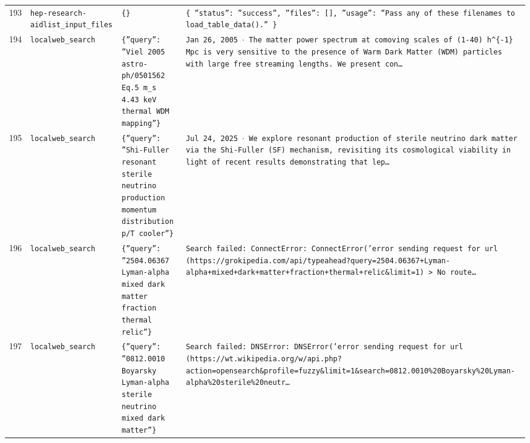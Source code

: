 \documentclass[11pt,a4paper]{article}
\begin{document}
\begin{longtable}{@{}p{}p{}p{}p{}@{}}
193 & \texttt{hep-research-aid}\newline\texttt{list\_\allowbreak{}input\_\allowbreak{}files} & \texttt{\{\}\allowbreak{}} & \texttt{\{   ''status'':\allowbreak{} ''success'',\allowbreak{}   ''files'':\allowbreak{} []\allowbreak{},\allowbreak{}   ''usage'':\allowbreak{} ''Pass any of these filenames to load\_\allowbreak{}table\_\allowbreak{}data()\allowbreak{}.'' \}\allowbreak{}} \\
194 & \texttt{local}\newline\texttt{web\_\allowbreak{}search} & \texttt{\{''query'':\allowbreak{} ''Viel 2005 astro-ph/\allowbreak{}0501562 Eq.5 m\_\allowbreak{}s 4.43 keV thermal WDM mapping''\}\allowbreak{}} & \texttt{Jan 26,\allowbreak{} 2005 $\cdot$ The matter power spectrum at comoving scales of (1-40)\allowbreak{} h\textasciicircum{}\allowbreak{}\{-1\}\allowbreak{} Mpc is very sensitive to the presence of Warm Dark Matter (WDM)\allowbreak{} particles with large free streaming lengths. We present con\ldots{}\allowbreak{}} \\
195 & \texttt{local}\newline\texttt{web\_\allowbreak{}search} & \texttt{\{''query'':\allowbreak{} ''Shi-Fuller resonant sterile neutrino production momentum distribution p/\allowbreak{}T cooler''\}\allowbreak{}} & \texttt{Jul 24,\allowbreak{} 2025 $\cdot$ We explore resonant production of sterile neutrino dark matter via the Shi-Fuller (SF)\allowbreak{} mechanism,\allowbreak{} revisiting its cosmological viability in light of recent results demonstrating that lep\ldots{}\allowbreak{}} \\
196 & \texttt{local}\newline\texttt{web\_\allowbreak{}search} & \texttt{\{''query'':\allowbreak{} ''2504.06367 Lyman-alpha mixed dark matter fraction thermal relic''\}\allowbreak{}} & \texttt{Search failed:\allowbreak{} ConnectError:\allowbreak{} ConnectError('error sending request for url (https:\allowbreak{}/\allowbreak{}/\allowbreak{}grokipedia.com/\allowbreak{}api/\allowbreak{}typeahead?query=\allowbreak{}2504.06367+Lyman-alpha+mixed+dark+matter+fraction+thermal+relic\&limit=\allowbreak{}1)\allowbreak{} \textgreater{}\allowbreak{} No route\ldots{}\allowbreak{}} \\
197 & \texttt{local}\newline\texttt{web\_\allowbreak{}search} & \texttt{\{''query'':\allowbreak{} ''0812.0010 Boyarsky Lyman-alpha sterile neutrino mixed dark matter''\}\allowbreak{}} & \texttt{Search failed:\allowbreak{} DNSError:\allowbreak{} DNSError('error sending request for url (https:\allowbreak{}/\allowbreak{}/\allowbreak{}wt.wikipedia.org/\allowbreak{}w/\allowbreak{}api.php?action=\allowbreak{}opensearch\&profile=\allowbreak{}fuzzy\&limit=\allowbreak{}1\&search=\allowbreak{}0812.0010\%20Boyarsky\%20Lyman-alpha\%20sterile\%20neutr\ldots{}\allowbreak{}} \\

\end{longtable}
\end{document}
